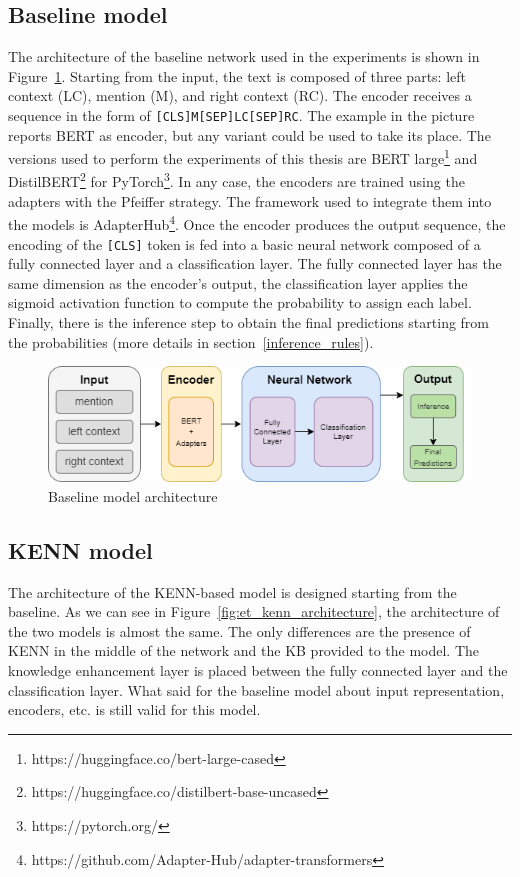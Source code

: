 \subsection{Baseline model} \label{baseline_model}
The architecture of the baseline network used in the experiments is shown in Figure~\ref{fig:et_baseline_architecture}. Starting from the input, the text is composed of three parts: left context (LC), mention (M), and right context (RC). The encoder receives a sequence in the form of \verb|[CLS]M[SEP]LC[SEP]RC|.  The example in the picture reports BERT as encoder, but any variant could be used to take its place. The versions used to perform the experiments of this thesis are BERT large\footnote{https://huggingface.co/bert-large-cased} and DistilBERT\footnote{https://huggingface.co/distilbert-base-uncased} for PyTorch\footnote{https://pytorch.org/}. In any case, the encoders are trained using the adapters with the Pfeiffer strategy. The framework used to integrate them into the models is AdapterHub\footnote{https://github.com/Adapter-Hub/adapter-transformers}. Once the encoder produces the output sequence, the encoding of the \verb|[CLS]| token is fed into a basic neural network composed of a fully connected layer and a classification layer. The fully connected layer has the same dimension as the encoder's output, the classification layer applies the sigmoid activation function to compute the probability to assign each label. Finally, there is the inference step to obtain the final predictions starting from the probabilities (more details in section~\ref{inference_rules}).

\begin{figure}[H]
    \centering
    \includegraphics[width=.8\linewidth]{figures/et_baseline_architecture.png}
    \caption{Baseline model architecture}
    \label{fig:et_baseline_architecture}
\end{figure}


\subsection{KENN model} \label{kenn_model}
The architecture of the KENN-based model is designed starting from the baseline. As we can see in Figure~\ref{fig:et_kenn_architecture}, the architecture of the two models is almost the same. The only differences are the presence of KENN in the middle of the network and the KB provided to the model. The knowledge enhancement layer is placed between the fully connected layer and the classification layer. What said for the baseline model about input representation, encoders, etc. is still valid for this model.

